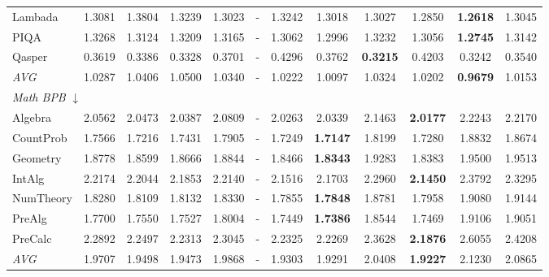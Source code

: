 \begin{table}[htbp]
\begin{tabular}{lccccccccccc}
Lambada & 1.3081 & 1.3804 & 1.3239 & 1.3023 & - & 1.3242 & 1.3018 & 1.3027 & 1.2850 & \textbf{1.2618} & 1.3045 \\
PIQA & 1.3268 & 1.3124 & 1.3209 & 1.3165 & - & 1.3062 & 1.2996 & 1.3232 & 1.3056 & \textbf{1.2745} & 1.3142 \\
Qasper & 0.3619 & 0.3386 & 0.3328 & 0.3701 & - & 0.4296 & 0.3762 & \textbf{0.3215} & 0.4203 & 0.3242 & 0.3540 \\
\textit{AVG} & 1.0287 & 1.0406 & 1.0500 & 1.0340 & - & 1.0222 & 1.0097 & 1.0324 & 1.0202 & \textbf{0.9679} & 1.0153 \\
\midrule
\multicolumn{12}{l}{\textit{Math BPB} $\downarrow$} \\
Algebra & 2.0562 & 2.0473 & 2.0387 & 2.0809 & - & 2.0263 & 2.0339 & 2.1463 & \textbf{2.0177} & 2.2243 & 2.2170 \\
CountProb & 1.7566 & 1.7216 & 1.7431 & 1.7905 & - & 1.7249 & \textbf{1.7147} & 1.8199 & 1.7280 & 1.8832 & 1.8674 \\
Geometry & 1.8778 & 1.8599 & 1.8666 & 1.8844 & - & 1.8466 & \textbf{1.8343} & 1.9283 & 1.8383 & 1.9500 & 1.9513 \\
IntAlg & 2.2174 & 2.2044 & 2.1853 & 2.2140 & - & 2.1516 & 2.1703 & 2.2960 & \textbf{2.1450} & 2.3792 & 2.3295 \\
NumTheory & 1.8280 & 1.8109 & 1.8132 & 1.8330 & - & 1.7855 & \textbf{1.7848} & 1.8781 & 1.7958 & 1.9080 & 1.9144 \\
PreAlg & 1.7700 & 1.7550 & 1.7527 & 1.8004 & - & 1.7449 & \textbf{1.7386} & 1.8544 & 1.7469 & 1.9106 & 1.9051 \\
PreCalc & 2.2892 & 2.2497 & 2.2313 & 2.3045 & - & 2.2325 & 2.2269 & 2.3628 & \textbf{2.1876} & 2.6055 & 2.4208 \\
\textit{AVG} & 1.9707 & 1.9498 & 1.9473 & 1.9868 & - & 1.9303 & 1.9291 & 2.0408 & \textbf{1.9227} & 2.1230 & 2.0865 \\
\bottomrule
\end{tabular}
\end{table}